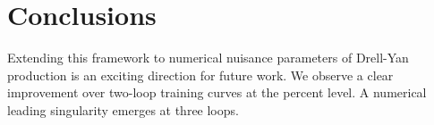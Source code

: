 \section{Conclusions}\label{sec:conclusions}

Extending this framework to numerical nuisance parameters of Drell-Yan
production is an exciting direction for future work. We observe a clear
improvement over two-loop training curves at the percent level. A
numerical leading singularity emerges at three loops.

